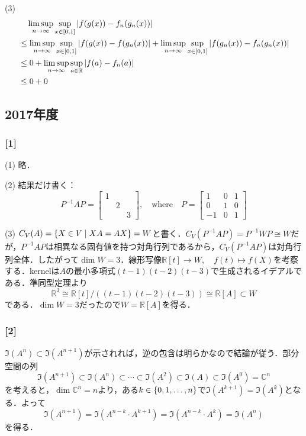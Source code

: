 \documentclass[a4j]{ltjsarticle}
\newcommand{\Rset}{\mathbb{R}}
\newcommand{\Cset}{\mathbb{C}}
\newcommand{\1}{\mathbbm{1}}
\numberwithin{equation}{section}
\theoremstyle{definition}
\begin{document}
(3) 
\begin{align}
    &\quad \limsup_{n\to\infty}\sup_{x\in[0,1]}\abs{f(g(x))-f_n(g_n(x))}\\
    &\leq \limsup_{n\to\infty}\sup_{x\in[0,1]}\abs{f(g(x))-f(g_n(x))}+\limsup_{n\to\infty}\sup_{x\in[0,1]}\abs{f(g_n(x))-f_n(g_n(x))}\\
    &\leq 0+\limsup_{n\to\infty}\sup_{a\in\Rset}\abs{f(a)-f_n(a)}\\
    &\leq 0+0
\end{align}
\subsection{2017年度}
\subsubsection*{[1]}
(1) 略．

(2) 結果だけ書く：
\begin{equation}
    P^{-1}AP=\begin{bmatrix}
        1 & & \\
         & 2 & \\
         & & 3
    \end{bmatrix},\quad \text{where}\quad P=\begin{bmatrix}
        1 & 0 & 1 \\
        0 & 1 & 0 \\
        -1 & 0 & 1 
    \end{bmatrix}
\end{equation}

(3) $C_{V}(A)=\qty{X\in V\mid XA=AX}=W$と書く．$C_{V}(P^{-1}AP)=P^{-1}WP\cong W$だが，$P^{-1}AP$は相異なる固有値を持つ対角行列であるから，$C_{V}(P^{-1}AP)$は対角行列全体．したがって$\dim W=3$．線形写像$\Rset[t]\to W,\quad f(t)\mapsto f(X)$を考察する．kernelは$A$の最小多項式$(t-1)(t-2)(t-3)$で生成されるイデアルである．準同型定理より
\begin{equation}
    \Rset^3 \cong \Rset[t]/((t-1)(t-2)(t-3))\cong \Rset[A]\subset W 
\end{equation}
である．$\dim W=3$だったので$W=\Rset[A]$を得る．
\subsubsection*{[2]}
$\Im(A^{n})\subset \Im(A^{n+1})$が示されれば，逆の包含は明らかなので結論が従う．部分空間の列
\begin{equation}
    \Im(A^{n+1})\subset \Im(A^{n})\subset \cdots\subset \Im(A^{2})\subset \Im(A)\subset \Im(A^0)=\Cset^n
\end{equation}
を考えると，$\dim \Cset^n=n$より，ある$k\in\qty{0,1,\ldots,n}$で$\Im(A^{k+1})=\Im(A^k)$となる．よって
\begin{equation}
    \Im(A^{n+1})=\Im(A^{n-k}\cdot A^{k+1})=\Im(A^{n-k}\cdot A^{k})=\Im(A^n)
\end{equation}
を得る．
\end{document}
